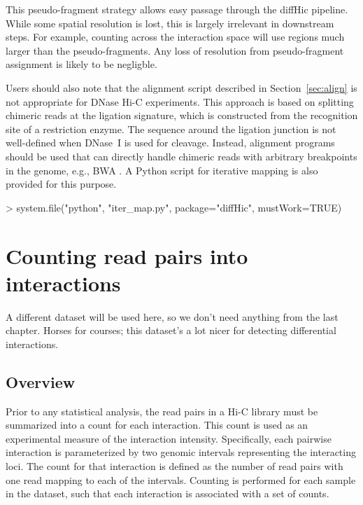 \documentclass[12pt]{report}
\renewenvironment{Schunk}{\vspace{0pt}}{\vspace{0pt}}
\newcommand{\pkgname}{diffHic}
\newenvironment{combox}
{ \begin{shaded}\begin{center}\begin{minipage}[t]{0.95\textwidth} }
{ \end{minipage}\end{center}\end{shaded} }
\begin{document}
This pseudo-fragment strategy allows easy passage through the \pkgname{} pipeline.
While some spatial resolution is lost, this is largely irrelevant in downstream steps.
For example, counting across the interaction space will use regions much larger than the pseudo-fragments. 
Any loss of resolution from pseudo-fragment assignment is likely to be negligble.

Users should also note that the alignment script described in Section~\ref{sec:align} is not appropriate for DNase Hi-C experiments.
This approach is based on splitting chimeric reads at the ligation signature, which is constructed from the recognition site of a restriction enzyme.
The sequence around the ligation junction is not well-defined when DNase~I is used for cleavage.
Instead, alignment programs should be used that can directly handle chimeric reads with arbitrary breakpoints in the genome, e.g., BWA \citep{li2010fast}.
A Python script for iterative mapping \citep{imakaev2012iterative} is also provided for this purpose.

\begin{Schunk}
\begin{Sinput}
> system.file("python", "iter_map.py", package="diffHic", mustWork=TRUE)
\end{Sinput}
\end{Schunk}


\chapter{Counting read pairs into interactions}
\label{chap:counting}

\begin{combox}
A different dataset will be used here, so we don't need anything from the last chapter.
Horses for courses; this dataset's a lot nicer for detecting differential interactions.
\end{combox}

\section{Overview}
Prior to any statistical analysis, the read pairs in a Hi-C library must be summarized into a count for each interaction.
This count is used as an experimental measure of the interaction intensity.
Specifically, each pairwise interaction is parameterized by two genomic intervals representing the interacting loci.
The count for that interaction is defined as the number of read pairs with one read mapping to each of the intervals.
Counting is performed for each sample in the dataset, such that each interaction is associated with a set of counts.
\end{document}
